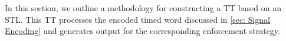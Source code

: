 \begin{figure*}[t]
        
        \end{figure*}

    In this section, we outline a methodology for constructing a TT based on an STL. This TT processes the encoded timed word discussed in \cref{sec: Signal Encoding} and generates output for the corresponding enforcement strategy. 
    
    
